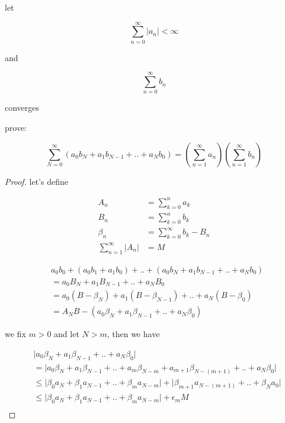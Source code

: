 \begin{exercise}
    let

    \[
        \sum_{n=0}^{\infty} \lvert a_n \rvert < \infty
    \]

    and

    \[
        \sum_{n=0}^{\infty} b_n
    \]

    converges

    prove:

    \[
        \sum_{N=0}^{\infty}(a_0b_N + a_1b_{N-1} + .. + a_Nb_0) = \left(\sum_{n=1}^{\infty} a_n \right)\left(\sum_{n=1}^{\infty} b_n \right)
    \]
\end{exercise}

\begin{proof}
    let's define

    \begin{align*}
        A_n &= \sum_{k=0}^{n}a_k \\
        B_n &= \sum_{k=0}^{n}b_k \\
        \beta_n &= \sum_{k=0}^{\infty}b_k - B_n \\
        \sum_{n=1}^{\infty}\lvert A_n \rvert &= M
    \end{align*}

    \begin{align*}
        & a_0b_0 + (a_0b_1 + a_1b_0) + .. + (a_0b_N + a_1b_{N-1} + .. + a_Nb_0) \\
        & = a_0B_N + a_1B_{N-1} + .. + a_NB_0 \\
        &= a_0(B - \beta_N) + a_1(B-\beta_{N-1}) + .. + a_N(B-\beta_{0}) \\
        &= A_NB - \left( a_0\beta_N + a_1 \beta_{N-1} + .. + a_N\beta_{0}\right)
    \end{align*}    

    we fix $m > 0$ and let $N > m$, then we have

    \begin{align*}
        & \lvert a_0\beta_N + a_1 \beta_{N-1} + .. + a_N\beta_{0} \rvert \\
        & = \lvert a_0\beta_N + a_1 \beta_{N-1} + .. + a_m\beta_{N-m} + a_{m+1}\beta_{N-(m+1)} + .. + a_N\beta_{0} \rvert \\
        & \le \lvert \beta_0a_N + \beta_1 a_{N-1} + .. + \beta_ma_{N-m} \rvert + \lvert \beta_{m+1}a_{N-(m+1)} + .. + \beta_Na_{0} \rvert \\
        & \le \lvert \beta_0a_N + \beta_1 a_{N-1} + .. + \beta_ma_{N-m} \rvert + \epsilon_m M \\
    \end{align*}


\end{proof}
